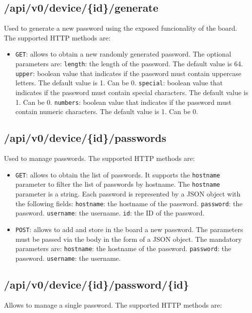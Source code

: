 \subsection{/api/v0/device/\{id\}/generate}
Used to generate a new password using the exposed funcionality of the board. The supported HTTP methods are:

\begin{itemize}
    \item \texttt{GET}: allows to obtain a new randomly generated password. The optional parameters are:
        \subitem \texttt{length}: the length of the password. The default value is 64.
        \subitem \texttt{upper}: boolean value that indicates if the password must contain uppercase letters. The default value is 1. Can be 0.
        \subitem \texttt{special}: boolean value that indicates if the password must contain special characters. The default value is 1. Can be 0.
        \subitem \texttt{numbers}: boolean value that indicates if the password must contain numeric characters. The default value is 1. Can be 0.
\end{itemize}

\subsection{/api/v0/device/\{id\}/passwords}
Used to manage passwords. The supported HTTP methods are:

\begin{itemize}
    \item \texttt{GET}: allows to obtain the list of passwords. It supports the \texttt{hostname} parameter to filter the list of passwords by hostname. The \texttt{hostname} parameter is a string. Each password is represented by a JSON object with the following fields:
        \subitem \texttt{hostname}: the hostname of the password.
        \subitem \texttt{password}: the password.
        \subitem \texttt{username}: the username.
        \subitem \texttt{id}: the ID of the password.
    \item \texttt{POST}: allows to add and store in the board a new password. The parameters must be passed via the body in the form of a JSON object. The mandatory parameters are:
        \subitem \texttt{hostname}: the hostname of the password.
        \subitem \texttt{password}: the password.
        \subitem \texttt{username}: the username.
\end{itemize}

\subsection{/api/v0/device/\{id\}/password/\{id\}}
Allows to manage a single password. The supported HTTP methods are:

